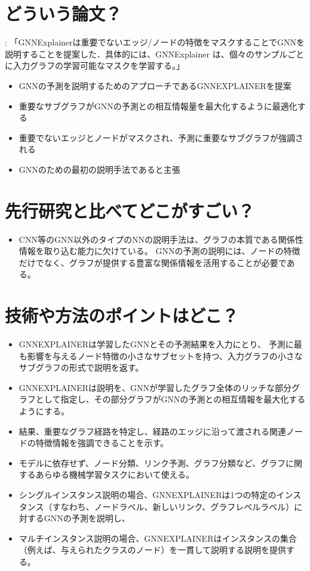 \documentclass[a4paper,10pt]{ltjsarticle}
\newcommand{\1}{\mbox{1}\hspace{-0.25em}\mbox{l}}
\theoremstyle{definition}
\begin{document}
    \section{どういう論文？}
    \cite{li2022explainability}: 「GNNExplainerは重要でないエッジ/ノードの特徴をマスクすることでGNNを説明することを提案した．具体的には、GNNExplainer は、個々のサンプルごとに入力グラフの学習可能なマスクを学習する。」
    \begin{itemize}
        \item GNNの予測を説明するためのアプローチであるGNNEXPLAINERを提案
        \item 重要なサブグラフがGNNの予測との相互情報量を最大化するように最適化する
        \item 重要でないエッジとノードがマスクされ、予測に重要なサブグラフが強調される
        \item GNNのための最初の説明手法であると主張
    \end{itemize}


    \section{先行研究と比べてどこがすごい？}
    \begin{itemize}
        \item CNN等のGNN以外のタイプのNNの説明手法は、グラフの本質である関係性情報を取り込む能力に欠けている。
        GNNの予測の説明には、ノードの特徴だけでなく、グラフが提供する豊富な関係情報を活用することが必要である。
    \end{itemize}


    \section{技術や方法のポイントはどこ？}
    \begin{itemize}
        \item GNNEXPLAINERは学習したGNNとその予測結果を入力にとり、
        予測に最も影響を与えるノード特徴の小さなサブセットを持つ、入力グラフの小さなサブグラフの形式で説明を返す。
        \item GNNEXPLAINERは説明を、GNNが学習したグラフ全体のリッチな部分グラフとして指定し、その部分グラフがGNNの予測との相互情報を最大化するようにする。
        \item 結果、重要なグラフ経路を特定し、経路のエッジに沿って渡される関連ノードの特徴情報を強調できることを示す。
    \end{itemize}
    \begin{itemize}
        \item モデルに依存せず、ノード分類、リンク予測、グラフ分類など、グラフに関するあらゆる機械学習タスクにおいて使える。
        \item シングルインスタンス説明の場合、GNNEXPLAINERは1つの特定のインスタンス（すなわち、ノードラベル、新しいリンク、グラフレベルラベル）に
        対するGNNの予測を説明し、
        \item マルチインスタンス説明の場合、GNNEXPLAINERはインスタンスの集合（例えば、与えられたクラスのノード）を一貫して説明する説明を提供する。
    \end{itemize}
\end{document}
